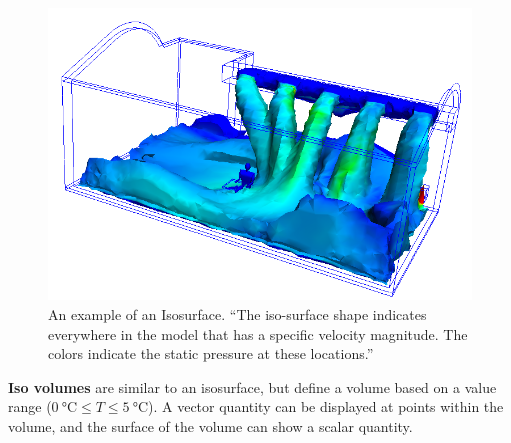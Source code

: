 \begin{figure}
    \centering
    \includegraphics[width=\linewidth]{Ch20Research/figures/isosurface.png}
    \caption{An example of an Isosurface. ``The iso-surface shape indicates everywhere in the model that has a specific velocity magnitude. The colors indicate the static pressure at these locations.''}
    \label{fig:AutodeskCFDIsosurface}
\end{figure}

\textbf{Iso volumes} are similar to an isosurface, but define a volume based on a value range ($\SI{0}{\celsius} \leq T \leq \SI{5}{\celsius}$).
A vector quantity can be displayed at points within the volume, and the surface of the volume can show a scalar quantity.


